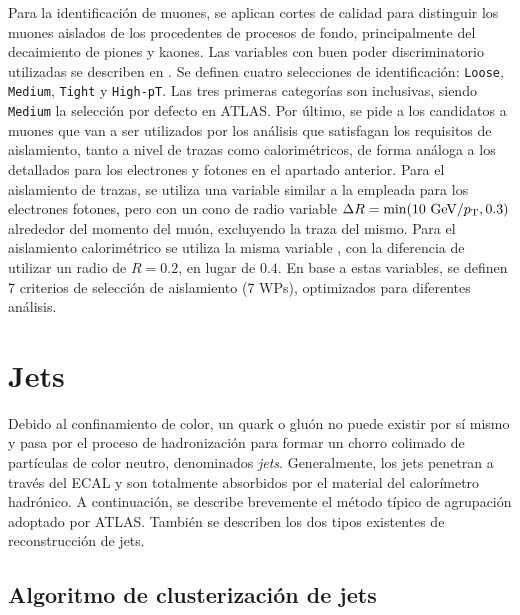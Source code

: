 Para la identificación de muones, se aplican cortes de calidad para distinguir los muones aislados de los procedentes de procesos de fondo, principalmente del decaimiento de piones y kaones.
Las variables con buen poder discriminatorio utilizadas se describen en . Se definen cuatro selecciones de identificación: \texttt{Loose}, \texttt{Medium}, \texttt{Tight} y \texttt{High-pT}. Las tres primeras categorías son inclusivas, siendo \texttt{Medium} la selección por defecto en \ac{ATLAS}. Por último, se pide a los candidatos a muones que van a ser utilizados por los análisis que satisfagan los requisitos de aislamiento, tanto a nivel de trazas como calorimétricos, de forma análoga a los detallados para los electrones y fotones en el apartado anterior. Para el aislamiento de trazas, se utiliza una variable similar a la empleada para los electrones fotones, pero con un cono de radio variable \(\Delta R = \min(10~\text{GeV}/p_{\text{T}}, 0.3)\) alrededor del momento del muón, excluyendo la traza del mismo. Para el aislamiento calorimétrico se utiliza la misma variable \etconefo, con la diferencia de utilizar un radio de \(R=0.2\), en lugar de \(0.4\). En base a estas variables, se definen 7 criterios de selección de aislamiento (7 \acp{WP}), optimizados para diferentes análisis.








\section{Jets}


Debido al confinamiento de color, un quark o gluón no puede existir por sí mismo y pasa por el proceso de hadronización para formar un chorro colimado de partículas de color neutro, denominados \textit{jets}. Generalmente, los jets penetran a través del \ac{ECAL} y son totalmente absorbidos por el material del calorímetro hadrónico. A continuación, se describe brevemente el método típico de agrupación adoptado por \ac{ATLAS}. También se describen los dos tipos existentes de reconstrucción de jets.


\subsection{Algoritmo de clusterizaci\'on de jets \antikt}

